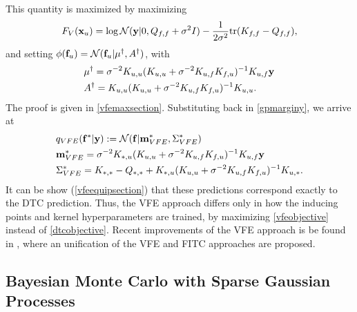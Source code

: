 This quantity is maximized by maximizing
\begin{equation}\label{vfeobjective}
F_V({\mathbf x}_u) = \log \mathcal{N}(\mathbf{y}|0,Q_{f,f} + \sigma^2 I) - \frac{1}{2 \sigma^2} \text{tr}(K_{f,f} - Q_{f,f}),
\end{equation}
and setting $\phi({\mathbf f}_u) = \mathcal{N}({\mathbf f}_u|\mu^\dagger,A^\dagger)$, with
\begin{equation}\label{vfeobjective2}
\begin{split}
& \mu^\dagger = \sigma^{-2} K_{u,u} (K_{u,u} + \sigma^{-2} K_{u,f} K_{f,u})^{-1} K_{u,f} {\mathbf y} \\
& A^\dagger = K_{u,u} (K_{u,u} + \sigma^{-2} K_{u,f} K_{f,u})^{-1} K_{u,u}.
\end{split}
\end{equation}
The proof is given in \ref{vfemaxsection}. Substituting back in \eqref{gpmarginy}, we arrive at 
\begin{equation}\label{vfeprediction}
\begin{split}
& q_{VFE}({\mathbf f}^*|{\mathbf y}) := \mathcal{N}({\mathbf f}|{\mathbf m}_{VFE}^*,\Sigma_{VFE}^*) \\
& {\mathbf m}_{VFE}^* = \sigma^{-2} K_{*,u} (K_{u,u} + \sigma^{-2} K_{u,f} K_{f,u})^{-1} K_{u,f} {\mathbf y} \\
& \Sigma_{VFE}^* = K_{*,*} - Q_{*,*} + K_{*,u} (K_{u,u} + \sigma^{-2} K_{u,f} K_{f,u})^{-1} K_{u,*}.\\
\end{split}
\end{equation}
It can be show (\ref{vfeequipsection}) that these predictions correspond exactly to the DTC prediction. Thus, the VFE approach differs only in how the inducing points and kernel hyperparameters are trained, by maximizing \eqref{vfeobjective} instead of \eqref{dtcobjective}. Recent improvements of the VFE approach is be found in \cite{Bui_2016}, where an unification of the VFE and FITC approaches are proposed.

\subsection{Bayesian Monte Carlo with Sparse Gaussian Processes}


